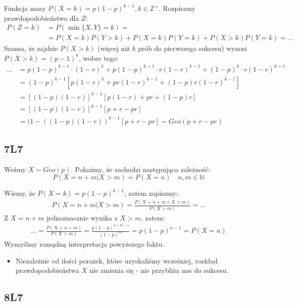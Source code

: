 \documentclass{article}
\begin{document}
Funkcja masy $P(X=k) = p(1-p)^{k-1}, k\in\mathbb{Z}^{+}$. Rozpiszmy prawdopodobieństwo dla $Z$:
\setcounter{equation}{0}
\begin{align}
    P(Z=k) &= P(\min\{X,Y\}=k) =\\
    &= P(X=k)P(Y>k) + P(X=k)P(Y=k) + P(X>k)P(Y=k) = \dots
\end{align}
Szansa, że zajdzie $P(X>k)$ (więcej niż $k$ prób do pierwszego sukcesu) wynosi $P(X>k)=(p-1)^k$, wobec tego:
\begin{align}
    \dots &= p(1-p)^{k-1}\cdot (1-r)^{k} + p(1-p)^{k-1}\cdot r(1-r)^{k-1} + (1-p)^k \cdot r(1-r)^{k-1}\\
    &= (1-p)^{k-1}\left[p(1-r)^k + pr(1-r)^{k-1} + (1-p)r(1-r)^{k-1} \right]\\
    &= \left[(1-p)(1-r)\right]^{k-1}\left[p(1-r) + pr + (1-p)r\right]\\
    &= \left[(1-p)(1-r)\right]^{k-1}\left[p + r - pr\right]\\
    &= (1-\left((1-p)(1-r)\right)^{k-1}\left[p+r - pr\right] 
    \sim Geo(p+r-pr)
\end{align}

\subsection{7L7}

Weźmy $X\sim Geo(p)$. Pokażmy, że zachodzi następująca zależność:
\[
    P(X=n+m|X>m) = P(X=n) \quad n,m\in\mathbb{N}
\]

\noindent
Wiemy, że $P(X=k) = p(1-p)^{k-1}$, zatem zapiszmy:
\setcounter{equation}{0}
\begin{align}
    P(X=n+m|X>m) = \frac{P(X=n+m \land X>m)}{P(X>m)} = \dots
\end{align} 
Z $X=n+m$ jednoznacznie wynika z $X>m$, zatem:
\begin{align}
    \dots = \frac{P(X=n+m)}{P(X>m)} = \frac{p(1-p)^{n+m-1}}{(1-p)^{m}} = p(1-p)^{n-1} = P(X=n)
\end{align}
Wymyślmy rozsądną interpretacja powyższego faktu.
\begin{itemize}
    \item Niezależnie od ilości porażek, które uzyskaliśmy wcześniej, rozkład prawdopodobieństwa $X$ nie zmienia się - nie przybliża nas do sukcesu.
\end{itemize}


\subsection{8L7}
\end{document}
